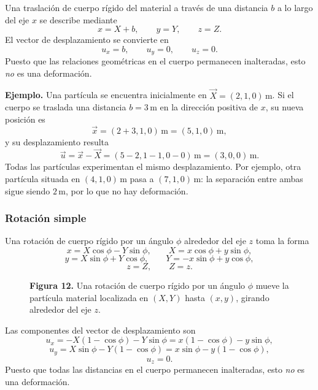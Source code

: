 Una traslación de cuerpo rígido del material a través de una distancia $b$ a lo largo del eje $x$ se describe mediante
\[ x = X + b, \qquad y = Y, \qquad z = Z. \]
El vector de desplazamiento se convierte en
\[ u_x = b, \qquad u_y = 0, \qquad u_z = 0. \]
Puesto que las relaciones geométricas en el cuerpo permanecen inalteradas, esto \emph{no} es una deformación.

\textbf{Ejemplo.} Una partícula se encuentra inicialmente en $\vec X=(2,1,0)\,\mathrm{m}$. Si el cuerpo se traslada una distancia $b=3\,\mathrm{m}$ en la dirección positiva de $x$, su nueva posición es
\[
\vec x=(2+3,1,0)\,\mathrm{m}=(5,1,0)\,\mathrm{m},
\]
y su desplazamiento resulta
\[
\vec u=\vec x-\vec X=(5-2,1-1,0-0)\,\mathrm{m}
=(3,0,0)\,\mathrm{m}.
\]
Todas las partículas experimentan el mismo desplazamiento. Por ejemplo, otra partícula situada en $(4,1,0)\,\mathrm{m}$ pasa a $(7,1,0)\,\mathrm{m}$: la separación entre ambas sigue siendo $2\,\mathrm{m}$, por lo que no hay deformación.

\subsubsection{Rotación simple}

Una rotación de cuerpo rígido por un ángulo $\phi$ alrededor del eje $z$ toma la forma
\[ x = X\cos\phi - Y\sin\phi, \qquad X = x\cos\phi + y\sin\phi, \]
\[ y = X\sin\phi + Y\cos\phi, \qquad Y = -x\sin\phi + y\cos\phi, \]
\[ z = Z, \qquad Z = z. \]

\begin{figure}[H]
\centering

\par\medskip
\textbf{Figura 12.} Una rotación de cuerpo rígido por un ángulo $\phi$ mueve la partícula material localizada en $(X, Y)$ hasta $(x, y)$, girando alrededor del eje $z$.
\end{figure}
Las componentes del vector de desplazamiento son
\[ u_x = -X(1 - \cos\phi) - Y\sin\phi = x(1 - \cos\phi) - y\sin\phi, \]
\[ u_y = X\sin\phi - Y(1 - \cos\phi) = x\sin\phi - y(1 - \cos\phi), \]
\[ u_z = 0. \]
Puesto que todas las distancias en el cuerpo permanecen inalteradas, esto \emph{no} es una deformación.

